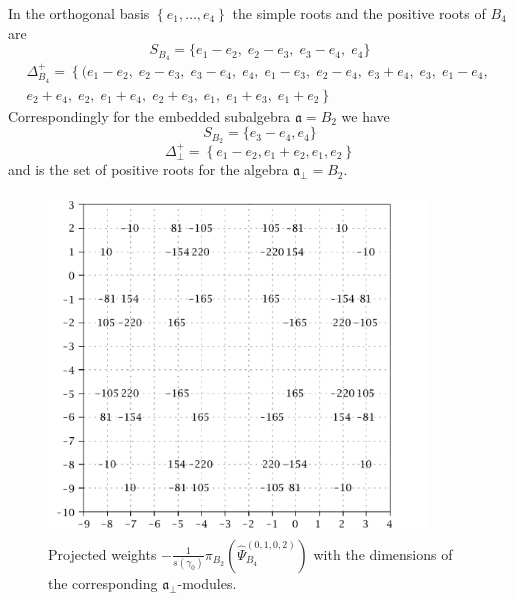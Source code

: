 \documentclass[a4paper,12pt]{article}
\theoremstyle{definition} \newtheorem{Def}{Definition}
\begin{document}
In the orthogonal basis $\left\{e_1,\dots,e_4\right\}$ the simple roots and the positive roots of $B_4$ are
\begin{equation}
  \label{eq:8}
 S_{B_4}= \{e_1 - e_2,\; e_2 - e_3,\; e_3 - e_4,\; e_4\}
\end{equation}
\begin{multline}
  \label{eq:19}
 \Delta^+_{B_4}=\left\{ (e_1 - e_2,\; e_2 - e_3,\; e_3 - e_4,\; e_4,\; e_1 - e_3,\; e_2 - e_4,\; e_3 + e_4,\; e_3,\; e_1 - e_4,\;\right.\\
 \left. e_2 + e_4,\; e_2,\; e_1 + e_4,\; e_2 + e_3,\; e_1,\; e_1 + e_3,\; e_1 + e_2\right\}
\end{multline}
Correspondingly for the embedded subalgebra $\mathfrak{a}=B_2$ we have
\begin{equation}
  \label{eq:26}
 S_{B_2}=\{e_3-e_4,e_4\}
\end{equation}
\begin{equation}
  \label{eq:27}
 \Delta^{+}_{\bot}= \left\{e_1-e_2,e_1+e_2,e_1,e_2\right\}
\end{equation}
and is the set of positive roots for the algebra $\mathfrak{a}_{\bot}=B_2$.
\begin{figure}[p]
  \centering
    \includegraphics[width=100mm,height=90mm]{B4_B2_anom_points.pdf}
  \caption{Projected weights $-\frac{1}{s(\gamma_0)}\pi_{B_2}\left(\hat \Psi^{(0,1,0,2)}_{B_4}\right)$ with the dimensions of the corresponding $\mathfrak{a}_{\bot}$-modules.}
  \label{fig:B4B2anom}
\end{figure}
\end{document}
